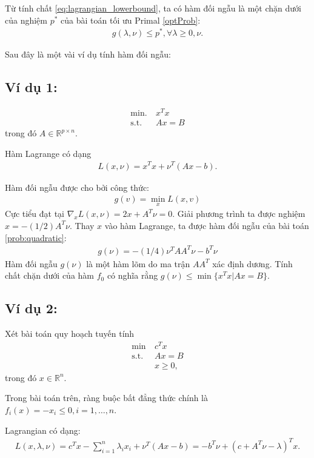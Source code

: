 \documentclass{book}
\begin{document}
Từ tính chất \eqref{eq:lagrangian_lowerbound}, ta có hàm  đối ngẫu là một chặn dưới của nghiệm $p^*$ của bài toán tối ưu Primal \eqref{optProb}: 
\begin{align}
g(\lambda, \nu) \leq p^*, \forall \lambda \geq 0, \nu.
\end{align}

Sau đây là một vài ví dụ tính hàm  đối ngẫu:

\subsection*{Ví dụ 1:} 
\begin{align}
\mathrm{min.~} & x^T x 		\label{prob:quadratic}\\
\mathrm{s.t.~} & Ax = B 
\end{align}
trong đó $A \in \mathbb{R}^{p \times n}$.

Hàm Lagrange có dạng 
\begin{align*}
L(x, \nu) = x^T x + \nu^T(Ax - b).
\end{align*} 

Hàm đối ngẫu được cho bởi công thức:
\begin{align*}
g(v) = \min_x L(x, v)
\end{align*}
Cực tiểu đạt tại $\nabla_x L(x, \nu) = 2x + A^T \nu = 0$. Giải phương trình ta được nghiệm $x = -(1/2) A^T \nu$.
Thay $x$ vào hàm Lagrange, ta được hàm đối ngẫu của bài toán \eqref{prob:quadratic}:
\begin{align*}
g(\nu) = -(1/4) \nu^T A A^T \nu - b^T \nu
\end{align*}
Hàm đối ngẫu $g(\nu)$ là một hàm lõm do ma trận $AA^T$ xác định dương. 
Tính chất chặn dưới của hàm $f_0$ có nghĩa rằng $g(\nu) \leq \min\{x^T x | Ax = B\}$.

\subsection*{Ví dụ 2:}
Xét bài toán quy hoạch tuyến tính
\begin{align}
\mathrm{min~} & c^T x \label{prob:lp}\\
\mathrm{s.t.~} & Ax = B \\
			& x \geq 0,
\end{align}
trong đó $x \in \mathbb{R}^n$. 

Trong bài toán trên, ràng buộc bất đẳng thức chính là $f_i(x) = - x_i \leq 0, i = 1, \ldots, n$.

Lagrangian có dạng: 
\begin{align*}
L(x, \lambda, \nu) = c^T x - \sum_{i = 1}^n \lambda_i x_i + \nu^T (Ax - b) = -b^T \nu + (c + A^T \nu - \lambda)^T x.
\end{align*}
\end{document}
